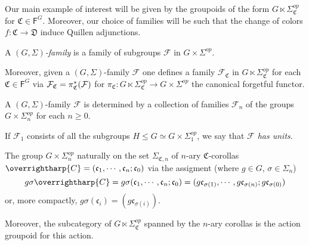 \documentclass[a4paper,10pt
,draft
]{article}%
\renewcommand{\F}{\mathcal F}
\renewcommand{\1}{\eta}%
\newcommand{\vect}[1]{\text{\overrightharp{\ensuremath{#1}}}}
\begin{document}
Our main example of interest will be given by the groupoids of the form
$G \ltimes \Sigma^{op}_{\mathfrak{C}}$ for 
$\mathfrak{C} \in \mathsf{F}^G$.
Moreover, our choice of families will be such that the
change of colors $f\colon \mathfrak{C} \to \mathfrak{D}$ 
induce Quillen adjunctions.


\begin{definition}\label{GSFAM_DEF}
A \emph{$(G,\Sigma)$-family} is a family of subgroups $\mathcal{F}$ in $G \times \Sigma^{op}$.

Moreover, given a $(G,\Sigma)$-family $\F$
one defines a family
$\mathcal{F}_{\mathfrak{C}}$ in
$G \ltimes \Sigma^{op}_{\mathfrak{C}}$
for each $\mathfrak{C} \in \mathsf{F}^G$
via $\mathcal{F}_{\mathfrak{C}} = \pi^{\**}_{\mathfrak{C}}(\mathcal{F})$
for $\pi_{\mathfrak{C}} \colon G \ltimes \Sigma_{\mathfrak{C}}^{op} \to G \times \Sigma^{op}$
the canonical forgetful functor.
\end{definition}



\begin{remark}
A $(G,\Sigma)$-family $\F$
is determined by a collection of families
$\F_n$ of the groups $G\times \Sigma_n^{op}$ for each $n \geq 0$.
\end{remark}



\begin{notation}\label{HASUNIT NOT}
If $\F_1$ consists of all the subgroups 
$H \leq G \simeq G \times \Sigma_1^{op}$, 
we say that \textit{$\F$ has units}.
\end{notation}



\begin{remark}\label{SIGACT REM}
The group $G \times \Sigma_n^{op}$
naturally on the set $\Sigma_{\mathfrak{C},n}$
of $n$-ary $\mathfrak{C}$-corollas
$\vect{C} = (\mathfrak{c}_1,\cdots,\mathfrak{c}_n;\mathfrak{c}_0)$
via the assigment (where $g \in G$, $\sigma \in \Sigma_n$)
\[
g \sigma \vect{C} =
g \sigma (\mathfrak{c}_1,\cdots,\mathfrak{c}_n;\mathfrak{c}_0)
=
(g\mathfrak{c}_{\sigma(1)},\cdots,g\mathfrak{c}_{\sigma(n)};g\mathfrak{c}_{\sigma(0)})
\]
or, more compactly, $g \sigma (\mathfrak{c}_i) = (g \mathfrak{c}_{\sigma(i)})$.

Moreover, the subcategory of $G \ltimes \Sigma^{op}_{\mathfrak{C}}$
spanned by the $n$-ary corollas is the action groupoid for this action.
\end{remark}
\end{document}
